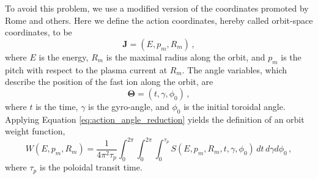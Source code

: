 To avoid this problem, we use a modified version of the coordinates promoted by Rome\cite{rome1979} and others\cite{petrov2016}.
Here we define the action coordinates, hereby called orbit-space coordinates, to be
\begin{equation}\label{eq:orbit_action}
    \mathbf{J} = (E, p_m, R_m)\,,
\end{equation}
where $E$ is the energy, $R_m$ is the maximal radius along the orbit, and $p_m$ is the pitch with respect to the plasma current at $R_m$.
The angle variables, which describe the position of the fast ion along the orbit, are
\begin{equation}\label{eq:orbit_angle}
    \mathbf{\Theta} = (t, \gamma, \phi_0)\,,
\end{equation}
where $t$ is the time, $\gamma$ is the gyro-angle, and $\phi_0$ is the initial toroidal angle.
Applying Equation \ref{eq:action_angle_reduction} yields the definition of an orbit weight function,
\begin{equation}\label{eq:orbit_weight}
    W(E,p_m,R_{m}) = \frac{1}{4\pi^2 \tau_p}\int_0^{2\pi} \int_0^{2\pi} \int_0^{\tau_p} S(E,p_m,R_{m},t,\gamma,\phi_0)\,dt\, d\gamma d\phi_0\,,
\end{equation}
where $\tau_p$ is the poloidal transit time.

